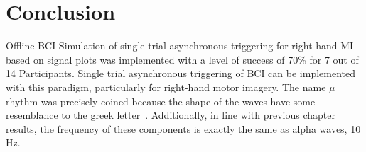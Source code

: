\section{Conclusion}

Offline BCI Simulation of single trial asynchronous triggering for right hand MI based on signal plots was implemented with a level of success of 70\% for 7 out of 14 Participants. Single trial asynchronous triggering of BCI can be implemented with this paradigm, particularly for right-hand motor imagery. The name $\mu$ rhythm was precisely coined because the shape of the waves have some resemblance to the greek letter~\cite{Cole2017}.   Additionally, in line with previous chapter results, the frequency of these components is exactly the same as alpha waves, 10 Hz.



